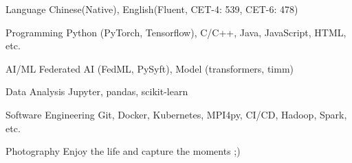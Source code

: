 

\begin{cvskills}

\cvskill
{Language} %
{Chinese(Native), English(Fluent, CET-4: 539, CET-6: 478)} %

\cvskill
{Programming} %
{Python (PyTorch, Tensorflow), C/C++, Java, JavaScript, HTML, etc.} %

\cvskill
{AI/ML} %
{Federated AI (FedML, PySyft), Model (transformers, timm)} %

\cvskill
{Data Analysis} %
{Jupyter, pandas, scikit-learn} %

\cvskill
{Software Engineering} %
{Git, Docker, Kubernetes, MPI4py, CI/CD, Hadoop, Spark, etc.} %

\cvskill
{Photography} %
{Enjoy the life and capture the moments ;)} %


\end{cvskills}